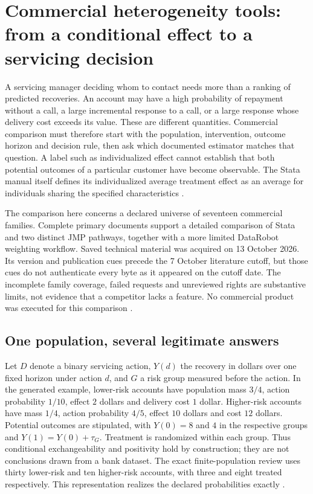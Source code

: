 \section{Commercial heterogeneity tools: from a conditional effect to a servicing decision}
\label{exec13:commercial-heterogeneity}

A servicing manager deciding whom to contact needs more than a ranking of
predicted recoveries. An account may have a high probability of repayment
without a call, a large incremental response to a call, or a large response
whose delivery cost exceeds its value. These are different quantities.
Commercial comparison must therefore start with the population, intervention,
outcome horizon and decision rule, then ask which documented estimator matches
that question. A label such as individualized effect cannot establish that
both potential outcomes of a particular customer have become observable.
The Stata manual itself defines its individualized average treatment effect
as an average for individuals sharing the specified characteristics
\citep{exec13_ch_stata}.

The comparison here concerns a declared universe of seventeen commercial
families. Complete primary documents support a detailed comparison of Stata
and two distinct JMP pathways, together with a more limited DataRobot
weighting workflow. Saved technical material was acquired on 13 October 2026.
Its version and publication cues precede the 7 October literature cutoff,
but those cues do not authenticate every byte as it appeared on the cutoff
date. The incomplete family coverage, failed requests and unreviewed rights
are substantive limits, not evidence that a competitor lacks a feature.
No commercial product was executed for this comparison
\citep{exec13_ch_scope}.

\subsection{One population, several legitimate answers}

Let $D$ denote a binary servicing action, $Y(d)$ the recovery in dollars over
one fixed horizon under action $d$, and $G$ a risk group measured before the
action. In the generated example, lower-risk accounts have population mass
$3/4$, action probability $1/10$, effect $2$ dollars and delivery cost $1$
dollar. Higher-risk accounts have mass $1/4$, action probability $4/5$, effect
$10$ dollars and cost $12$ dollars. Potential outcomes are stipulated, with
$Y(0)=8$ and $4$ in the respective groups and $Y(1)=Y(0)+\tau_G$. Treatment
is randomized within each group. Thus conditional exchangeability and
positivity hold by construction; they are not conclusions drawn from a bank
dataset. The exact finite-population review uses thirty lower-risk and ten
higher-risk accounts, with three and eight treated respectively. This
representation realizes the declared probabilities exactly
\citep{exec13_ch_exact}.

